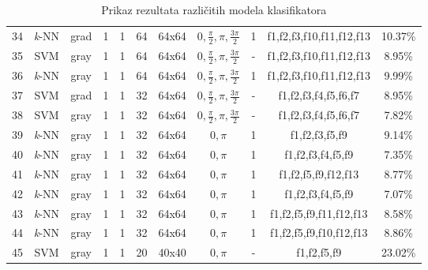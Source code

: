 \documentclass[times, utf8, zavrsni]{fer}
\begin{document}
\begin{table}[ht]
\begin{adjustwidth}{-30pt}{0pt}
\begin{tabular}{c|c|c|c|c|c|c|c|c|c|c}
34 & \textit{k}-NN & grad & 1 & 1 & 64 & 64x64 & \(0, \frac{\pi}{2}, \pi, \frac{3\pi}{2}\) & 1 & f1,f2,f3,f10,f11,f12,f13 & 10.37\% \\
35 & SVM & gray & 1 & 1 & 64 & 64x64 & \(0, \frac{\pi}{2}, \pi, \frac{3\pi}{2}\) & - & f1,f2,f3,f10,f11,f12,f13 & 8.95\% \\
36 & \textit{k}-NN & gray & 1 & 1 & 64 & 64x64 & \(0, \frac{\pi}{2}, \pi, \frac{3\pi}{2}\) & 1 & f1,f2,f3,f10,f11,f12,f13 & 9.99\% \\
37 & SVM & grad & 1 & 1 & 32 & 64x64 & \(0, \frac{\pi}{2}, \pi, \frac{3\pi}{2}\) & - & f1,f2,f3,f4,f5,f6,f7 & 8.95\% \\
38 & SVM & gray & 1 & 1 & 32 & 64x64 & \(0, \frac{\pi}{2}, \pi, \frac{3\pi}{2}\) & - & f1,f2,f3,f4,f5,f6,f7 & 7.82\% \\
39 & \textit{k}-NN & gray & 1 & 1 & 32 & 64x64 & \(0, \pi\) & 1 & f1,f2,f3,f5,f9 & 9.14\% \\
40 & \textit{k}-NN & gray & 1 & 1 & 32 & 64x64 & \(0, \pi\) & 1 & f1,f2,f3,f4,f5,f9 & 7.35\% \\
41 & \textit{k}-NN & gray & 1 & 1 & 32 & 64x64 & \(0, \pi\) & 1 & f1,f2,f5,f9,f12,f13 & 8.77\% \\
42 & \textit{k}-NN & gray & 1 & 1 & 32 & 64x64 & \(0, \pi\) & 1 & f1,f2,f3,f4,f5,f9 & 7.07\% \\
43 & \textit{k}-NN & gray & 1 & 1 & 32 & 64x64 & \(0, \pi\) & 1 & f1,f2,f5,f9,f11,f12,f13 & 8.58\% \\
44 & \textit{k}-NN & gray & 1 & 1 & 32 & 64x64 & \(0, \pi\) & 1 & f1,f2,f5,f9,f10,f12,f13 & 8.86\% \\
45 & SVM & gray & 1 & 1 & 20 & 40x40 & \(0, \pi\) & - & f1,f2,f5,f9 & 23.02\% \\
\end{tabular}
\end{adjustwidth}
\caption{Prikaz rezultata različitih modela klasifikatora} 
\end{table}
\end{document}
